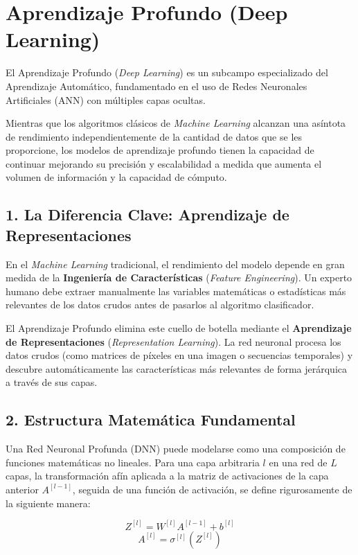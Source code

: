 \section{Aprendizaje Profundo (Deep Learning)}

El Aprendizaje Profundo (\textit{Deep Learning}) es un subcampo especializado del Aprendizaje Automático, fundamentado en el uso de Redes Neuronales Artificiales (ANN) con múltiples capas ocultas. 

Mientras que los algoritmos clásicos de \textit{Machine Learning} alcanzan una asíntota de rendimiento independientemente de la cantidad de datos que se les proporcione, los modelos de aprendizaje profundo tienen la capacidad de continuar mejorando su precisión y escalabilidad a medida que aumenta el volumen de información y la capacidad de cómputo.

\subsection{1. La Diferencia Clave: Aprendizaje de Representaciones}
En el \textit{Machine Learning} tradicional, el rendimiento del modelo depende en gran medida de la \textbf{Ingeniería de Características} (\textit{Feature Engineering}). Un experto humano debe extraer manualmente las variables matemáticas o estadísticas más relevantes de los datos crudos antes de pasarlos al algoritmo clasificador.

El Aprendizaje Profundo elimina este cuello de botella mediante el \textbf{Aprendizaje de Representaciones} (\textit{Representation Learning}). La red neuronal procesa los datos crudos (como matrices de píxeles en una imagen o secuencias temporales) y descubre automáticamente las características más relevantes de forma jerárquica a través de sus capas.

\subsection{2. Estructura Matemática Fundamental}
Una Red Neuronal Profunda (DNN) puede modelarse como una composición de funciones matemáticas no lineales. Para una capa arbitraria $l$ en una red de $L$ capas, la transformación afín aplicada a la matriz de activaciones de la capa anterior $A^{[l-1]}$, seguida de una función de activación, se define rigurosamente de la siguiente manera:

\begin{equation}
    Z^{[l]} = W^{[l]} A^{[l-1]} + b^{[l]}
\end{equation}
\begin{equation}
    A^{[l]} = \sigma^{[l]}(Z^{[l]})
\end{equation}

